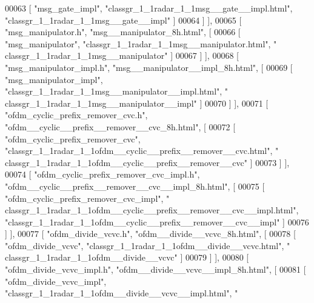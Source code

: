 \begin{DoxyCode}
00063       [ \textcolor{stringliteral}{"msg\_gate\_impl"}, \textcolor{stringliteral}{"classgr\_1\_1radar\_1\_1msg\_\_gate\_\_impl.html"}, \textcolor{stringliteral}{"classgr\_1\_1radar\_1\_1msg\_\_gate\_\_impl"} 
      ]
00064     ] ],
00065     [ \textcolor{stringliteral}{"msg\_manipulator.h"}, \textcolor{stringliteral}{"msg\_\_manipulator\_8h.html"}, [
00066       [ \textcolor{stringliteral}{"msg\_manipulator"}, \textcolor{stringliteral}{"classgr\_1\_1radar\_1\_1msg\_\_manipulator.html"}, \textcolor{stringliteral}{"
      classgr\_1\_1radar\_1\_1msg\_\_manipulator"} ]
00067     ] ],
00068     [ \textcolor{stringliteral}{"msg\_manipulator\_impl.h"}, \textcolor{stringliteral}{"msg\_\_manipulator\_\_impl\_8h.html"}, [
00069       [ \textcolor{stringliteral}{"msg\_manipulator\_impl"}, \textcolor{stringliteral}{"classgr\_1\_1radar\_1\_1msg\_\_manipulator\_\_impl.html"}, \textcolor{stringliteral}{"
      classgr\_1\_1radar\_1\_1msg\_\_manipulator\_\_impl"} ]
00070     ] ],
00071     [ \textcolor{stringliteral}{"ofdm\_cyclic\_prefix\_remover\_cvc.h"}, \textcolor{stringliteral}{"ofdm\_\_cyclic\_\_prefix\_\_remover\_\_cvc\_8h.html"}, [
00072       [ \textcolor{stringliteral}{"ofdm\_cyclic\_prefix\_remover\_cvc"}, \textcolor{stringliteral}{"classgr\_1\_1radar\_1\_1ofdm\_\_cyclic\_\_prefix\_\_remover\_\_cvc.html"}, \textcolor{stringliteral}{"
      classgr\_1\_1radar\_1\_1ofdm\_\_cyclic\_\_prefix\_\_remover\_\_cvc"} ]
00073     ] ],
00074     [ \textcolor{stringliteral}{"ofdm\_cyclic\_prefix\_remover\_cvc\_impl.h"}, \textcolor{stringliteral}{"ofdm\_\_cyclic\_\_prefix\_\_remover\_\_cvc\_\_impl\_8h.html"}, [
00075       [ \textcolor{stringliteral}{"ofdm\_cyclic\_prefix\_remover\_cvc\_impl"}, \textcolor{stringliteral}{"
      classgr\_1\_1radar\_1\_1ofdm\_\_cyclic\_\_prefix\_\_remover\_\_cvc\_\_impl.html"}, \textcolor{stringliteral}{"classgr\_1\_1radar\_1\_1ofdm\_\_cyclic\_\_prefix\_\_remover\_\_cvc\_\_impl"} ]
00076     ] ],
00077     [ \textcolor{stringliteral}{"ofdm\_divide\_vcvc.h"}, \textcolor{stringliteral}{"ofdm\_\_divide\_\_vcvc\_8h.html"}, [
00078       [ \textcolor{stringliteral}{"ofdm\_divide\_vcvc"}, \textcolor{stringliteral}{"classgr\_1\_1radar\_1\_1ofdm\_\_divide\_\_vcvc.html"}, \textcolor{stringliteral}{"
      classgr\_1\_1radar\_1\_1ofdm\_\_divide\_\_vcvc"} ]
00079     ] ],
00080     [ \textcolor{stringliteral}{"ofdm\_divide\_vcvc\_impl.h"}, \textcolor{stringliteral}{"ofdm\_\_divide\_\_vcvc\_\_impl\_8h.html"}, [
00081       [ \textcolor{stringliteral}{"ofdm\_divide\_vcvc\_impl"}, \textcolor{stringliteral}{"classgr\_1\_1radar\_1\_1ofdm\_\_divide\_\_vcvc\_\_impl.html"}, \textcolor{stringliteral}{"
}
\end{DoxyCode}
